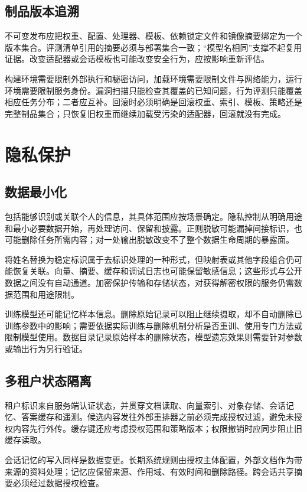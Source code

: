 \documentclass[../textbook.tex]{subfiles}
\begin{document}
\subsection{制品版本追溯}
不可变发布应把权重、配置、处理器、模板、依赖锁定文件和镜像摘要绑定为一个版本集合。评测清单引用的摘要必须与部署集合一致；“模型名相同”支撑不起复用证据。改变适配器或会话模板也可能改变安全行为，应按影响重新评估。

构建环境需要限制外部执行和秘密访问，加载环境需要限制文件与网络能力，运行环境需要限制服务身份。漏洞扫描只能检查其覆盖的已知问题，行为评测只能覆盖相应任务分布；二者应互补。回滚时必须明确是回滚权重、索引、模板、策略还是完整制品集合；只恢复旧权重而继续加载受污染的适配器，回滚就没有完成。

\section{隐私保护}

\subsection{数据最小化}
包括能够识别或关联个人的信息，其具体范围应按场景确定。隐私控制从明确用途和最小必要数据开始，再处理访问、保留和披露。正则脱敏可能漏掉间接标识，也可能删除任务所需内容；对一处输出脱敏改变不了整个数据生命周期的暴露面。

将姓名替换为稳定标识属于去标识处理的一种形式，但映射表或其他字段组合仍可能恢复关联。向量、摘要、缓存和调试日志也可能保留敏感信息；这些形式与公开数据之间没有自动通道。加密保护传输和存储状态，对获得解密权限的服务仍需数据范围和用途限制。

训练模型还可能记忆样本信息。删除原始记录可以阻止继续摄取，却不自动删除已训练参数中的影响；需要依据实际训练与删除机制分析是否重训、使用专门方法或限制模型使用。数据目录记录原始样本的删除状态，模型遗忘效果则需要针对参数或输出行为另行验证。

\subsection{多租户状态隔离}
租户标识来自服务端认证状态，并贯穿文档读取、向量索引、对象存储、会话记忆、答案缓存和遥测。候选内容发往外部重排器之前必须完成授权过滤，避免未授权内容先行外传。缓存键还应考虑授权范围和策略版本；权限撤销时应同步阻止旧缓存读取。

会话记忆的写入同样是数据变更。长期系统规则由授权主体配置，外部文档作为带来源的资料处理；记忆应保留来源、作用域、有效时间和删除路径。跨会话共享摘要必须经过数据授权检查。
\end{document}
